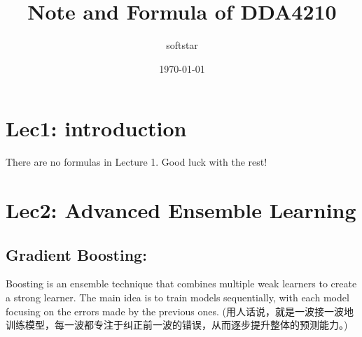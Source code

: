 \documentclass[UTF8]{ctexart}
\title{Note and Formula of DDA4210}
\author{softstar}
\date{\today}
\begin{document}
\maketitle

\section{Lec1: introduction}
There are no formulas in Lecture 1. Good luck with the rest!

\section{Lec2: Advanced Ensemble Learning}

\subsection{Gradient Boosting:}
Boosting is an ensemble technique that combines multiple weak learners to create a strong learner. The main idea is to train models sequentially, with each model focusing on the errors made by the previous ones.
(用人话说，就是一波接一波地训练模型，每一波都专注于纠正前一波的错误，从而逐步提升整体的预测能力。)
\end{document}
